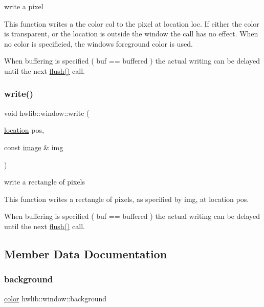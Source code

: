 write a pixel 

This function writes a the color col to the pixel at location loc. If either the color is transparent, or the location is outside the window the call has no effect. When no color is specificied, the window\textquotesingle{}s foreground color is used.

When buffering is specified ( buf == buffered ) the actual writing can be delayed until the next \hyperlink{classhwlib_1_1window_a2b654a98872d174173e1df24a444c949}{flush()} call. \mbox{\label{classhwlib_1_1window_ac87b3f0e82ab260f95a68e76f827d03b}} 
\subsubsection{\texorpdfstring{write()}{write()}\hspace{0.1cm}{\footnotesize\ttfamily [4/4]}}
{\footnotesize\ttfamily void hwlib\+::window\+::write (\begin{DoxyParamCaption}\item[{\hyperlink{classhwlib_1_1location}{location}}]{pos,  }\item[{const \hyperlink{classhwlib_1_1image}{image} \&}]{img }\end{DoxyParamCaption})\hspace{0.3cm}{\ttfamily [inline]}}



write a rectangle of pixels 

This function writes a rectangle of pixels, as specified by img, at location pos.

When buffering is specified ( buf == buffered ) the actual writing can be delayed until the next \hyperlink{classhwlib_1_1window_a2b654a98872d174173e1df24a444c949}{flush()} call. 

\subsection{Member Data Documentation}
\mbox{\label{classhwlib_1_1window_a1ca47e79ec54ea8b2f38b41b42593d2d}} 
\subsubsection{\texorpdfstring{background}{background}}
{\footnotesize\ttfamily \hyperlink{classhwlib_1_1color}{color} hwlib\+::window\+::background}



